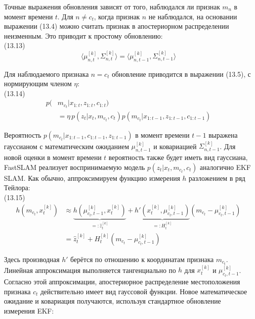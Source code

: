 \documentclass[10pt,a4paper]{article}
\begin{document}
Точные выражения обновления зависят от того, наблюдался ли признак $m_n$ в момент времени $t$. Для $n\neq c_t$, когда признак $n$ не наблюдался, на основании выражении (13.4) можно считать признак в апостериорном распределении неизменным. Это приводит к простому обновлению:\\

(13.13)
$$\langle\mu_{n,t}^{[k]},\varSigma_{n,t}^{[k]}\rangle=\langle\mu_{n,t-1}^{[k]},\varSigma_{n,t-1}^{[k]}\rangle$$

Для наблюдаемого признака $n=c_t$ обновление приводится в выражении (13.5), с нормирующим членом $\eta$:\\

(13.14)
\begin{equation*}
\begin{split}
p(&m_{c_t}|x_{1:t},z_{1:t},c_{1:t})\\
&=\eta\,p(z_t|x_t,m_{c_t},c_t)p(m_{c_t}|x_{1:t-1},z_{1:t-1},c_{1:t-1})
\end{split}
\end{equation*}

Вероятность $p(m_{c_t}|x_{1:t-1},c_{1:t-1},z_{1:t-1})$ в момент времени $t-1$ выражена гауссианом с математическим ожиданием $\mu_{n,t-1}^{[k]}$ и ковариацией $\varSigma_{n,t-1}^{[k]}$. Для новой оценки в момент времени $t$ вероятность также будет иметь вид гауссиана, FastSLAM реализует воспринимаемую модель  $p(z_t| x_t, m_{c_t}, c_t)$ аналогично  EKF  SLAM.  Как обычно, аппроксимируем функцию измерения $h$ разложением в ряд Тейлора:\\

(13.15)
\begin{equation*}
\begin{split}
h(m_{c_t},x_t^{[k]})&\approx\underbrace{h(\mu_{c_t,t-1}^{[k]},x_t^{[k]})}_{=:\hat{z}_t^{[k]}}+\underbrace{h'(x_t^{[k]},\mu_{c_t,t-1}^{[k]})}_{=:H_t^{[k]}}(m_{c_t}-\mu_{c_t,t-1}^{[k]})\\
&=\hat{z}_t^{[k]}+H_t^{[k]}(m_{c_t}-\mu_{c_t,t-1}^{[k]})
\end{split}
\end{equation*}

Здесь производная $h'$ берётся по отношению к координатам признака $m_{c_t}$.
Линейная аппроксимация выполняется тангенциально по $h$ для $x_t^{[k]}$  и $\mu_{c_t,t-1}^{[k]}$. Согласно этой аппроксимации, апостериорное распределение местоположения признака $c_t$ действительно имеет вид гауссовой функции. Новое математическое ожидание и ковариация получаются, используя стандартное обновление измерения EKF:\\
\end{document}
